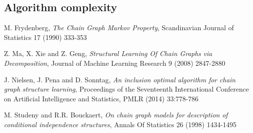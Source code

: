 \documentclass{pracamgr}
\theoremstyle{definition}
\begin{document}
		\subsection{Algorithm complexity}

\begin{thebibliography}{99}
	 M. Frydenberg, \textit{The Chain Graph Markov Property}, Scandinavian Journal of Statistics 17 (1990) 333-353	
	
	 Z. Ma, X. Xie and Z. Geng, \textit{Structural Learning Of Chain Graphs via Decomposition}, Journal of Machine Learning Research 9 (2008) 2847-2880

	 J. Nielsen, J. Pena and D. Sonntag, \textit{An inclusion optimal algorithm for chain graph structure learning}, Proceedings of the Seventeenth International
		Conference on Artificial Intelligence and Statistics, PMLR (2014) 33:778-786

	 M. Studeny and R.R. Bouckaert, \textit{On chain graph models for description of conditional independence structures}, Annals Of Statistics 26 (1998) 1434-1495
	
\end{thebibliography}
\end{document}
